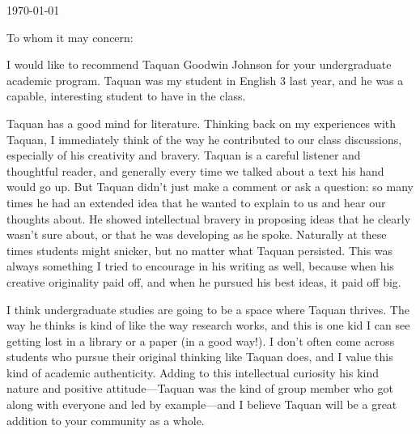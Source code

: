 \documentclass[11pt, letterpaper]{letter} %
\begin{document}

\begin{letter}{
	\today\\	
}


\opening{To whom it may concern:}

I would like to recommend Taquan Goodwin Johnson for your undergraduate academic program. Taquan was my student in English 3 last year, and he was a capable, interesting student to have in the class.

Taquan has a good mind for literature. Thinking back on my experiences with Taquan, I immediately think of the way he contributed to our class discussions, especially of his creativity and bravery. Taquan is a careful listener and thoughtful reader, and generally every time we talked about a text his hand would go up. But Taquan didn't just make a comment or ask a question: so many times he had an extended idea that he wanted to explain to us and hear our thoughts about. He showed intellectual bravery in proposing ideas that he clearly wasn't sure about, or that he was developing as he spoke. Naturally at these times students might snicker, but no matter what Taquan persisted. This was always something I tried to encourage in his writing as well, because when his creative originality paid off, and when he pursued his best ideas, it paid off big.

I think undergraduate studies are going to be a space where Taquan thrives. The way he thinks is kind of like the way research works, and this is one kid I can see getting lost in a library or a paper (in a good way!). I don't often come across students who pursue their original thinking like Taquan does, and I value this kind of academic authenticity. Adding to this intellectual curiosity his kind nature and positive attitude---Taquan was the kind of group member who got along with everyone and led by example---and I believe Taquan will be a great addition to your community as a whole.


\end{letter}
\end{document}
